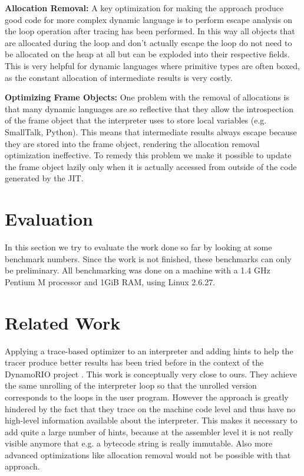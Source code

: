 \documentclass{acm_proc_article-sp}
\let\oldcite=\cite
\renewcommand\cite[1]{\ifthenelse{\equal{#1}{XXX}}{[citation~needed]}{\oldcite{#1}}}
\begin{document}
\textbf{Allocation Removal:} A key optimization for making the approach
produce good code for more complex dynamic language is to perform escape
analysis on the loop operation after tracing has been performed. In this way all
objects that are allocated during the loop and don't actually escape the loop do
not need to be allocated on the heap at all but can be exploded into their
respective fields.  This is very helpful for dynamic languages where primitive
types are often boxed, as the constant allocation of intermediate results is
very costly.

\textbf{Optimizing Frame Objects:} One problem with the removal of allocations
is that many dynamic languages are so reflective that they allow the
introspection of the frame object that the interpreter uses to store local
variables (e.g. SmallTalk, Python). This means that intermediate results always
escape because they are stored into the frame object, rendering the allocation
removal optimization ineffective. To remedy this problem we make it possible to
update the frame object lazily only when it is actually accessed from outside of
the code generated by the JIT.

\section{Evaluation}
\label{sect:evaluation}

In this section we try to evaluate the work done so far by looking at some
benchmark numbers. Since the work is not finished, these benchmarks can only be
preliminary. All benchmarking was done on a machine with a 1.4 GHz Pentium M
processor and 1GiB RAM, using Linux 2.6.27.


\section{Related Work}

Applying a trace-based optimizer to an interpreter and adding hints to help the
tracer produce better results has been tried before in the context of the DynamoRIO
project \cite{sullivan_dynamic_2003}. This work is conceptually very close to
ours. They achieve the same unrolling of the interpreter loop so that the
unrolled version corresponds to the loops in the user program. However the
approach is greatly hindered by the fact that they trace on the machine code
level and thus have no high-level information available about the interpreter.
This makes it necessary to add quite a large number of hints, because at the
assembler level it is not really visible anymore that e.g. a bytecode string is
really immutable. Also more advanced optimizations like allocation removal would
not be possible with that approach.
\end{document}
